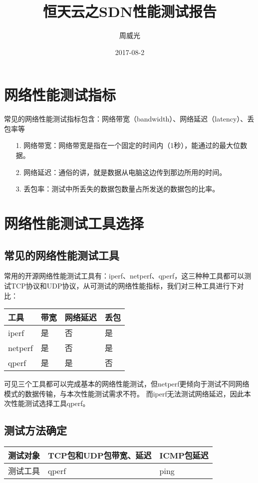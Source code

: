 \documentclass[a4paper,left=1.5cm,right=1.5cm,11pt]{article}
\title{恒天云之SDN性能测试报告}
\author{周威光}
\date{2017-08-2}
\begin{document}
\maketitle
\clearpage
\tableofcontents
\clearpage
\section{网络性能测试指标}
常见的网络性能测试指标包含：网络带宽（bandwidth）、网络延迟（latency）、丢包率等
\begin{itemize}
	\item[1.]网络带宽：网络带宽是指在一个固定的时间内（1秒），能通过的最大位数据。
	\item[2.]网络延迟：通俗的讲，就是数据从电脑这边传到那边所用的时间。
	\item[3.]丢包率：测试中所丢失的数据包数量占所发送的数据包的比率。
\end{itemize}

\section{网络性能测试工具选择}
\subsection{常见的网络性能测试工具}
常用的开源网络性能测试工具有：iperf、netperf、qperf，这三种种工具都可以测试TCP协议和UDP协议，从可测试的网络性能指标，我们对三种工具进行下对比：
\begin{center}
\begin{tabular}[c]{|l|l|l|l|}
\hline
工具 & 带宽 & 网络延迟 & 丢包 \\
\hline
iperf & 是 & 否 & 是 \\
\hline
netperf & 是 & 否 & 是 \\
\hline
qperf & 是 & 是 & 否 \\
\hline
\end{tabular}
\end{center}\par
可见三个工具都可以完成基本的网络性能测试，但netperf更倾向于测试不同网络模式的数据传输，与本次性能测试需求不符。
而iperf无法测试网络延迟，因此本次性能测试选择工具qperf。
\subsection{测试方法确定}
\begin{center}
\begin{tabular}[c]{|l|l|l|}
\hline
测试对象 & TCP包和UDP包带宽、延迟 & ICMP包延迟  \\
\hline
测试工具 & qperf & ping \\
\hline
\end{tabular}
\end{center}
\end{document}
